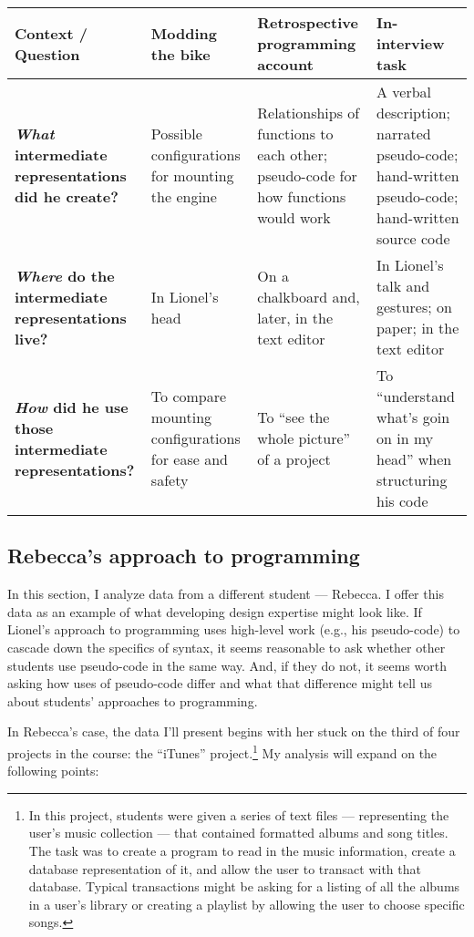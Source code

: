 \begin{longtable}[]{@{}llll@{}}
\toprule
\textbf{Context / Question} & Modding the bike & Retrospective
programming account & In-interview task\tabularnewline
\midrule
\endhead
\textbf{\emph{What} intermediate representations did he create?} &
Possible configurations for mounting the engine & Relationships of
functions to each other; pseudo-code for how functions would work & A
verbal description; narrated pseudo-code; hand-written pseudo-code;
hand-written source code\tabularnewline
\textbf{\emph{Where} do the intermediate representations live?} & In
Lionel's head & On a chalkboard and, later, in the text editor & In
Lionel's talk and gestures; on paper; in the text editor\tabularnewline
\textbf{\emph{How} did he use those intermediate representations?} & To
compare mounting configurations for ease and safety & To ``see the whole
picture'' of a project & To ``understand what's goin on in my head''
when structuring his code\tabularnewline
\bottomrule
\end{longtable}

\subsection{Rebecca's approach to
programming}\label{rebeccas-approach-to-programming}

In this section, I analyze data from a different student --- Rebecca. I
offer this data as an example of what developing design expertise might
look like. If Lionel's approach to programming uses high-level work
(e.g., his pseudo-code) to cascade down the specifics of syntax, it
seems reasonable to ask whether other students use pseudo-code in the
same way. And, if they do not, it seems worth asking how uses of
pseudo-code differ and what that difference might tell us about
students' approaches to programming.

In Rebecca's case, the data I'll present begins with her stuck on the
third of four projects in the course: the ``iTunes'' project.\footnote{In
  this project, students were given a series of text files ---
  representing the user's music collection --- that contained formatted
  albums and song titles. The task was to create a program to read in
  the music information, create a database representation of it, and
  allow the user to transact with that database. Typical transactions
  might be asking for a listing of all the albums in a user's library or
  creating a playlist by allowing the user to choose specific songs.} My
analysis will expand on the following points:

